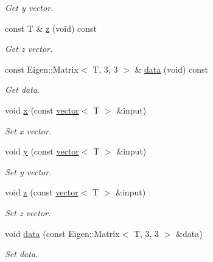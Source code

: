 \begin{DoxyCompactItemize}
\begin{DoxyCompactList}\small\item\em Get y vector. \end{DoxyCompactList}\item 
\mbox{\label{classddd_1_1mat_object_a627bb80e18863ae1b6dd9ba19750328b}} 
const T \& \hyperlink{classddd_1_1mat_object_a627bb80e18863ae1b6dd9ba19750328b}{z} (void) const
\begin{DoxyCompactList}\small\item\em Get z vector. \end{DoxyCompactList}\item 
\mbox{\label{classddd_1_1mat_object_a4e06f4a888443bc139c8081d664b4449}} 
const Eigen\+::\+Matrix$<$ T, 3, 3 $>$ \& \hyperlink{classddd_1_1mat_object_a4e06f4a888443bc139c8081d664b4449}{data} (void) const
\begin{DoxyCompactList}\small\item\em Get data. \end{DoxyCompactList}\item 
void \hyperlink{classddd_1_1mat_object_a9b1d7066a88e2f1b6cfb101fb783fdf6}{x} (const \hyperlink{classddd_1_1vector}{vector}$<$ T $>$ \&input)
\begin{DoxyCompactList}\small\item\em Set x vector. \end{DoxyCompactList}\item 
void \hyperlink{classddd_1_1mat_object_a638f5c083ccd96c6742f062d35810193}{y} (const \hyperlink{classddd_1_1vector}{vector}$<$ T $>$ \&input)
\begin{DoxyCompactList}\small\item\em Set y vector. \end{DoxyCompactList}\item 
void \hyperlink{classddd_1_1mat_object_ae234d843cfd0a90b5e67b946ec18bfea}{z} (const \hyperlink{classddd_1_1vector}{vector}$<$ T $>$ \&input)
\begin{DoxyCompactList}\small\item\em Set z vector. \end{DoxyCompactList}\item 
void \hyperlink{classddd_1_1mat_object_a5bff8ef1182818135f4b82e978ff3bbf}{data} (const Eigen\+::\+Matrix$<$ T, 3, 3 $>$ \&data)
\begin{DoxyCompactList}\small\item\em Set data. \end{DoxyCompactList}\end{DoxyCompactItemize}
